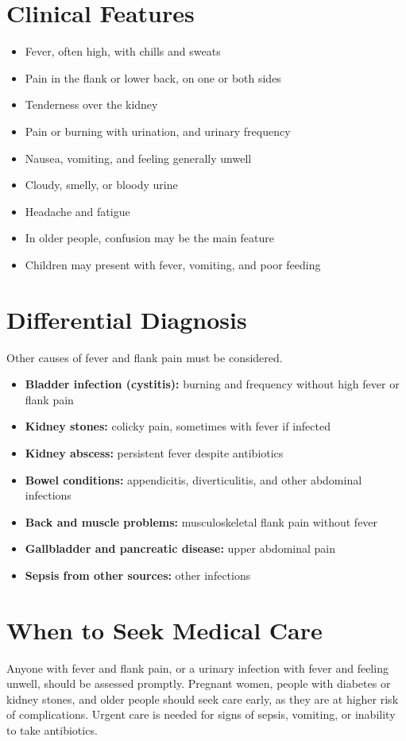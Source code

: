 \section*{Clinical Features}
\begin{itemize}
    \item Fever, often high, with chills and sweats
    \item Pain in the flank or lower back, on one or both sides
    \item Tenderness over the kidney
    \item Pain or burning with urination, and urinary frequency
    \item Nausea, vomiting, and feeling generally unwell
    \item Cloudy, smelly, or bloody urine
    \item Headache and fatigue
    \item In older people, confusion may be the main feature
    \item Children may present with fever, vomiting, and poor feeding
\end{itemize}

\section*{Differential Diagnosis}
Other causes of fever and flank pain must be considered.
\begin{itemize}
    \item \textbf{Bladder infection (cystitis):} burning and frequency without high fever or flank pain
    \item \textbf{Kidney stones:} colicky pain, sometimes with fever if infected
    \item \textbf{Kidney abscess:} persistent fever despite antibiotics
    \item \textbf{Bowel conditions:} appendicitis, diverticulitis, and other abdominal infections
    \item \textbf{Back and muscle problems:} musculoskeletal flank pain without fever
    \item \textbf{Gallbladder and pancreatic disease:} upper abdominal pain
    \item \textbf{Sepsis from other sources:} other infections
\end{itemize}

\section*{When to Seek Medical Care}
Anyone with fever and flank pain, or a urinary infection with fever and feeling unwell, should be assessed promptly. Pregnant women, people with diabetes or kidney stones, and older people should seek care early, as they are at higher risk of complications. Urgent care is needed for signs of sepsis, vomiting, or inability to take antibiotics.

